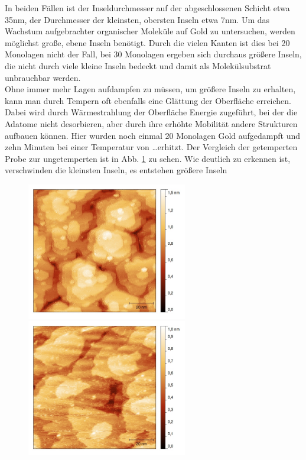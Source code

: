 In beiden Fällen ist der Inseldurchmesser auf der abgeschlossenen Schicht etwa 35nm, der Durchmesser
der kleinsten, obersten Inseln etwa 7nm. Um das Wachstum aufgebrachter organischer Moleküle auf Gold
zu untersuchen, werden möglichst große, ebene Inseln benötigt. Durch die vielen Kanten ist dies bei
20 Monolagen nicht der Fall, bei 30 Monolagen ergeben sich durchaus größere Inseln, die nicht durch
viele kleine Inseln bedeckt und damit als Molekülsubstrat unbrauchbar werden.\\
Ohne immer mehr Lagen aufdampfen zu müssen, um größere Inseln zu erhalten, kann man durch Tempern
oft ebenfalls eine Glättung der Oberfläche erreichen. Dabei wird durch Wärmestrahlung der Oberfläche
Energie zugeführt, bei der die Adatome nicht desorbieren, aber durch ihre erhöhte Mobilität
andere Strukturen aufbauen können. Hier wurden noch einmal 20 Monolagen Gold aufgedampft und zehn
Minuten bei einer Temperatur von \ldots erhitzt. Der Vergleich der getemperten Probe zur
ungetemperten ist in Abb. \ref{getVergleich} zu sehen.
Wie deutlich zu erkennen ist, verschwinden die kleinsten Inseln, es entstehen größere Inseln

\begin{figure}[htbp]
	\begin{minipage}[b]{0.5\textwidth} 
		\includegraphics[height=6cm]{20ML.jpg}
	\end{minipage}
	\hfill
	\begin{minipage}[b]{0.5\textwidth}
		\includegraphics[height=6cm]{20MLget2.jpg}
	\end{minipage}
	\caption{\textit{}}
	\label{getVergleich} 
\end{figure}